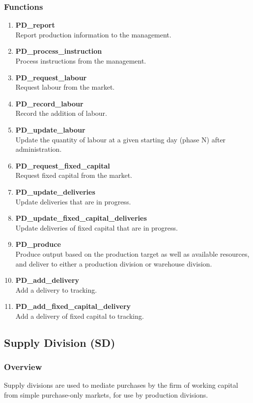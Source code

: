 \documentclass[11pt]{article}
\begin{document}
\subsubsection{Functions}
\begin{enumerate}
	\item \textbf{PD\_report} \\
	Report production information to the management.
	\item \textbf{PD\_process\_instruction} \\
	Process instructions from the management.
	\item \textbf{PD\_request\_labour} \\
	Request labour from the market.
	\item \textbf{PD\_record\_labour} \\
	Record the addition of labour.
	\item \textbf{PD\_update\_labour} \\
	Update the quantity of labour at a given starting day (phase N) after administration.
	\item \textbf{PD\_request\_fixed\_capital} \\
	Request fixed capital from the market.
	\item \textbf{PD\_update\_deliveries} \\
	Update deliveries that are in progress.
	\item \textbf{PD\_update\_fixed\_capital\_deliveries} \\
	Update deliveries of fixed capital that are in progress.
	\item \textbf{PD\_produce} \\
	Produce output based on the production target as well as available resources, and deliver to either a production division or warehouse division.
	\item \textbf{PD\_add\_delivery} \\
	Add a delivery to tracking.
	\item \textbf{PD\_add\_fixed\_capital\_delivery} \\
	Add a delivery of fixed capital to tracking.
\end{enumerate}

\subsection{Supply Division (SD)}

\subsubsection{Overview}
Supply divisions are used to mediate purchases by the firm of working capital from simple purchase-only markets, for use by production divisions.
\end{document}
